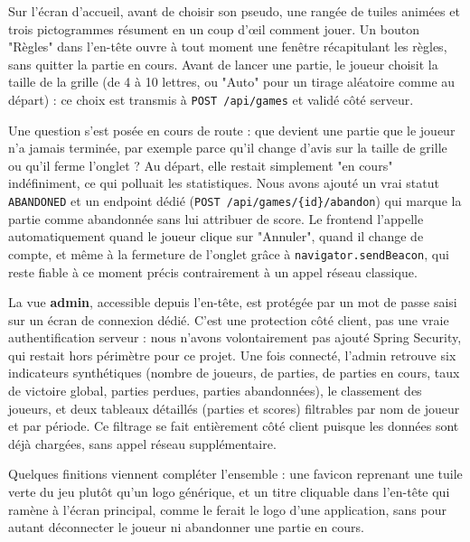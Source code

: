 \documentclass[11pt,a4paper]{article}
\begin{document}
Sur l'écran d'accueil, avant de choisir son pseudo, une rangée de tuiles animées et
trois pictogrammes résument en un coup d'\oe{}il comment jouer. Un bouton "Règles"
dans l'en-tête ouvre à tout moment une fenêtre récapitulant les règles, sans quitter
la partie en cours. Avant de lancer une partie, le joueur choisit la taille de la
grille (de 4 à 10 lettres, ou "Auto" pour un tirage aléatoire comme au départ) : ce
choix est transmis à \texttt{POST /api/games} et validé côté serveur.

Une question s'est posée en cours de route : que devient une partie que le joueur
n'a jamais terminée, par exemple parce qu'il change d'avis sur la taille de grille ou
qu'il ferme l'onglet ? Au départ, elle restait simplement "en cours" indéfiniment,
ce qui polluait les statistiques. Nous avons ajouté un vrai statut
\texttt{ABANDONED} et un endpoint dédié (\texttt{POST /api/games/\{id\}/abandon})
qui marque la partie comme abandonnée sans lui attribuer de score. Le frontend
l'appelle automatiquement quand le joueur clique sur "Annuler", quand il change de
compte, et même à la fermeture de l'onglet grâce à \texttt{navigator.sendBeacon},
qui reste fiable à ce moment précis contrairement à un appel réseau classique.

La vue \textbf{admin}, accessible depuis l'en-tête, est protégée par un mot de passe
saisi sur un écran de connexion dédié. C'est une protection côté client, pas une
vraie authentification serveur : nous n'avons volontairement pas ajouté Spring
Security, qui restait hors périmètre pour ce projet. Une fois connecté, l'admin
retrouve six indicateurs synthétiques (nombre de
joueurs, de parties, de parties en cours, taux de victoire global, parties perdues,
parties abandonnées), le classement des joueurs, et deux tableaux détaillés (parties
et scores) filtrables par nom de joueur et par période. Ce filtrage se fait entièrement
côté client puisque les données sont déjà chargées, sans appel réseau supplémentaire.

Quelques finitions viennent compléter l'ensemble : une favicon reprenant une tuile
verte du jeu plutôt qu'un logo générique, et un titre cliquable dans l'en-tête qui
ramène à l'écran principal, comme le ferait le logo d'une application, sans pour
autant déconnecter le joueur ni abandonner une partie en cours.

\end{document}
